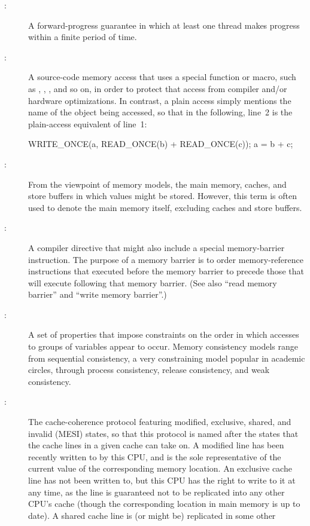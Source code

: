 \begin{description}
\item[:]
	A forward-progress guarantee in which at least one thread makes
	progress within a finite period of time.
\item[:]
	A source-code memory access that uses a special function or
	macro, such as , ,
	, and so on, in order to protect that access
	from compiler and/or hardware optimizations.
	In contrast, a plain access simply mentions the name of
	the object being accessed, so that in the following, line~2
	is the plain-access equivalent of line~1:
	\begin{VerbatimN}
	WRITE_ONCE(a, READ_ONCE(b) + READ_ONCE(c));
	a = b + c;
	\end{VerbatimN}
\item[:]
	From the viewpoint of memory models, the main memory,
	caches, and store buffers in which values might be stored.
	However, this term is often used to denote the main memory
	itself, excluding caches and store buffers.
\item[:]
	A compiler directive that might also include a special
	memory-barrier instruction.
	The purpose of a memory barrier is to order memory-reference
	instructions that executed before the memory barrier to precede
	those that will execute following that memory barrier.
	(See also ``read memory barrier'' and ``write memory barrier''.)
\item[:]
	A set of properties that impose constraints on the order in
	which accesses to groups of variables appear to occur.
	Memory consistency models range from sequential consistency,
	a very constraining model popular in academic circles, through
	process consistency, release consistency, and weak consistency.
\item[:]
	The
	cache-coherence protocol featuring
	modified, exclusive, shared, and invalid (MESI) states,
	so that this protocol is named after the states that the
	cache lines in a given cache can take on.
	A modified line has been recently written to by this CPU,
	and is the sole representative of the current value of
	the corresponding memory location.
	An exclusive cache line has not been written to, but this
	CPU has the right to write to it at any time, as the line
	is guaranteed not to be replicated into any other CPU's cache
	(though the corresponding location in main memory is up to date).
	A shared cache line is (or might be) replicated in some other

\end{description}
